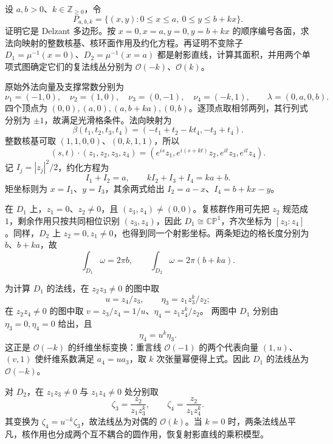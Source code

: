 \begin{exercise}\label{g4:ex:1205:trapezoid-normal-lines}
	设 \(a,b>0\)、\(k\in\mathbb Z_{\ge0}\)，令
	\[
		P_{a,b,k}=\{(x,y):0\le x\le a,\ 0\le y\le b+kx\}.
	\]
	证明它是 Delzant 多边形。按 \(x=0,x=a,y=0,y=b+kx\) 的顺序编号各面，求法向映射的整数核基、核环面作用及约化方程。再证明不变除子 \(D_1=\mu^{-1}(x=0)\)、\(D_2=\mu^{-1}(x=a)\) 都是射影直线，计算其面积，并用两个单项式图确定它们的复法线丛分别为 \(\mathcal O(-k)\)、\(\mathcal O(k)\)。
\end{exercise}
\begin{solution}
	原始外法向量及支撑常数分别为
	\[
		\nu_1=(-1,0),\quad\nu_2=(1,0),\quad
		\nu_3=(0,-1),\quad\nu_4=(-k,1),
		\qquad \lambda=(0,a,0,b).
	\]
	四个顶点为 \((0,0),(a,0),(a,b+ka),(0,b)\)。逐顶点取相邻两列，其行列式分别为 \(\pm1\)，故满足光滑格条件。法向映射为
	\[
		\beta(t_1,t_2,t_3,t_4)=(-t_1+t_2-kt_4,-t_3+t_4).
	\]
	整数核基可取 \((1,1,0,0)\)、\((0,k,1,1)\)，所以
	\[
		(s,t)\cdot(z_1,z_2,z_3,z_4)
		=(e^{is}z_1,e^{i(s+kt)}z_2,e^{it}z_3,e^{it}z_4).
	\]
	记 \(I_j=|z_j|^2/2\)，约化方程为
	\[
		I_1+I_2=a,\qquad kI_2+I_3+I_4=ka+b.
	\]
	矩坐标则为 \(x=I_1\)、\(y=I_3\)，其余两式给出
	\(I_2=a-x\)、\(I_4=b+kx-y\)。

	在 \(D_1\) 上，\(z_1=0\)、\(z_2\ne0\)，且
	\((z_3,z_4)\ne(0,0)\)。复核群作用可先把 \(z_2\) 规范成 \(1\)，剩余作用只按共同相位识别 \((z_3,z_4)\)，因此 \(D_1\cong\mathbb{CP}^1\)，齐次坐标为 \([z_3:z_4]\)。同样，\(D_2\) 上 \(z_2=0,z_1\ne0\)，也得到同一个射影坐标。两条矩边的格长度分别为 \(b\)、\(b+ka\)，故
	\[
		\int_{D_1}\omega=2\pi b,\qquad
		\int_{D_2}\omega=2\pi(b+ka).
	\]

	为计算 \(D_1\) 的法线，在 \(z_2z_3\ne0\) 的图中取
	\[
		u=z_4/z_3,\qquad
		\eta_3=z_1z_3^k/z_2;
	\]
	在 \(z_2z_4\ne0\) 的图中取
	\(v=z_3/z_4=1/u\)、\(\eta_4=z_1z_4^k/z_2\)。
	两图中 \(D_1\) 分别由 \(\eta_3=0,\eta_4=0\) 给出，且
	\[
		\eta_4=u^k\eta_3.
	\]
	这正是 \(\mathcal O(-k)\) 的纤维坐标变换：重言线
	\(\mathcal O(-1)\) 的两个代表向量 \((1,u)\)、\((v,1)\)
	使纤维系数满足 \(a_4=ua_3\)，取 \(k\) 次张量幂便得上式。因此 \(D_1\) 的法线丛为 \(\mathcal O(-k)\)。

	对 \(D_2\)，在 \(z_1z_3\ne0\) 与 \(z_1z_4\ne0\) 处分别取
	\[
		\zeta_3=\frac{z_2}{z_1z_3^k},\qquad
		\zeta_4=\frac{z_2}{z_1z_4^k}.
	\]
	其变换为 \(\zeta_4=u^{-k}\zeta_3\)，故法线丛为对偶的
	\(\mathcal O(k)\)。当 \(k=0\) 时，两条法线丛平凡，核作用也分成两个互不耦合的圆作用，恢复射影直线的乘积模型。
\end{solution}

